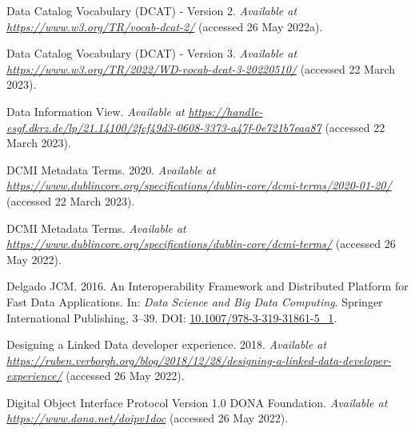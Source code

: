 \begin{CSLReferences}{1}{0}
\leavevmode{}%
Data Catalog Vocabulary (DCAT) - Version 2. \emph{Available at} \href{https://www.w3.org/TR/vocab-dcat-2/}{\emph{https://www.w3.org/TR/vocab-dcat-2/}} (accessed 26 May 2022a).

\leavevmode{}%
Data Catalog Vocabulary (DCAT) - Version 3. \emph{Available at} \href{https://www.w3.org/TR/2022/WD-vocab-dcat-3-20220510/}{\emph{https://www.w3.org/TR/2022/WD-vocab-dcat-3-20220510/}} (accessed 22 March 2023).

\leavevmode{}%
Data Information View. \emph{Available at} \href{https://handle-esgf.dkrz.de/lp/21.14100/2fcf49d3-0608-3373-a47f-0e721b7eaa87}{\emph{https://handle-esgf.dkrz.de/lp/21.14100/2fcf49d3-0608-3373-a47f-0e721b7eaa87}} (accessed 22 March 2023).

\leavevmode{}%
DCMI Metadata Terms. 2020. \emph{Available at} \href{https://www.dublincore.org/specifications/dublin-core/dcmi-terms/2020-01-20/}{\emph{https://www.dublincore.org/specifications/dublin-core/dcmi-terms/2020-01-20/}} (accessed 22 March 2023).

\leavevmode{}%
DCMI Metadata Terms. \emph{Available at} \href{https://www.dublincore.org/specifications/dublin-core/dcmi-terms/}{\emph{https://www.dublincore.org/specifications/dublin-core/dcmi-terms/}} (accessed 26 May 2022).

\leavevmode{}%
Delgado JCM. 2016. An Interoperability Framework and Distributed Platform for Fast Data Applications. In: \emph{Data Science and Big Data Computing}. Springer International Publishing, 3--39. DOI: \href{https://doi.org/10.1007/978-3-319-31861-5_1}{10.1007/978-3-319-31861-5\_1}.

\leavevmode{}%
Designing a Linked Data developer experience. 2018. \emph{Available at} \href{https://ruben.verborgh.org/blog/2018/12/28/designing-a-linked-data-developer-experience/}{\emph{https://ruben.verborgh.org/blog/2018/12/28/designing-a-linked-data-developer-experience/}} (accessed 26 May 2022).

\leavevmode{}%
Digital Object Interface Protocol Version 1.0 \textbar{} DONA Foundation. \emph{Available at} \href{https://www.dona.net/doipv1doc}{\emph{https://www.dona.net/doipv1doc}} (accessed 26 May 2022).


\end{CSLReferences}
